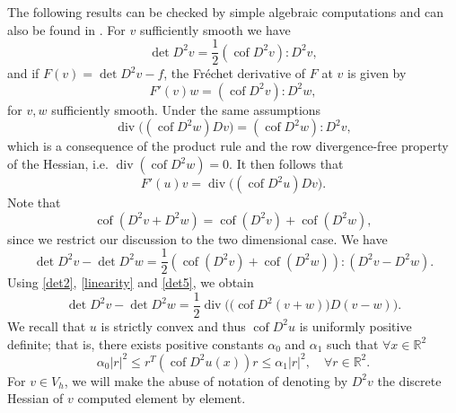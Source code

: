\documentclass[12pt]{amsart}
\numberwithin{equation}{section}
\newcommand\cof{\operatorname{cof}}
\renewcommand{\div}{\operatorname{div}}
\begin{document}
The following results can be checked by simple algebraic computations and can also be found in \cite{AwanouLiMixed1}. For $v$ sufficiently smooth we have
\begin{equation}\label{det1}
\det D^2 v = \frac{1}{2} (\cof  D^2 v): D^2 v,
\end{equation}
and if $F(v) = \det D^2 v -f$, the Fr\'echet derivative of $F$ at $v$ is given by  
\begin{equation}\label{det3} 
F'(v) w = (\cof  D^2 v): D^2 w,
\end{equation}
for $v,w$ sufficiently smooth. 
Under the same assumptions
\begin{equation}\label{det2}
\div\big((\cof D^2 w) D v )= (\cof  D^2 w): D^2 v,
\end{equation}
which is a consequence of the product rule and the row divergence-free property of the Hessian, i.e. $\div( \cof  D^2 w) =0$.
It then follows that
\begin{equation}\label{det4} 
F'(u)v= \div \big((\cof  D^2 u) D v \big). 
\end{equation}
Note that 
\begin{equation} \label{linearity}
\cof(D^2 v +D^2 w) = \cof(D^2 v) + \cof(D^2 w),
\end{equation}
 since we restrict our discussion to the two dimensional case.  
We have \cite{Brenner2010b}
\begin{equation}\label{det5}
\det D^2 v - \det D^2 w = \frac{1}{2} (\cof(D^2 v) + \cof(D^2 w)): (D^2 v - D^2 w).
\end{equation}
Using \eqref{det2}, \eqref{linearity} and  \eqref{det5}, we obtain
\begin{equation}\label{det6}
\det D^2 v - \det D^2 w = \frac{1}{2}\div \Big( \big( \cof D^2 (v+w)\big) D(v -w)\Big).
\end{equation}
We recall that $u$ is strictly convex and thus $\cof D^2 u $ is uniformly positive definite; that is, there exists positive constants $\alpha_0$ and $\alpha_1$ such that $\forall x \in \mathbb{R}^2$
\begin{equation}\label{SPD}
\alpha_0 |r|^2 \leq r^T (\cof D^2 u(x) ) r \leq \alpha_1 |r|^2, \quad \forall r \in \mathbb{R}^2.  
\end{equation}
For $v \in V_h$, we will make the abuse of notation of denoting by $D^2v$ the discrete Hessian of $v$ computed element by element.
\end{document}
